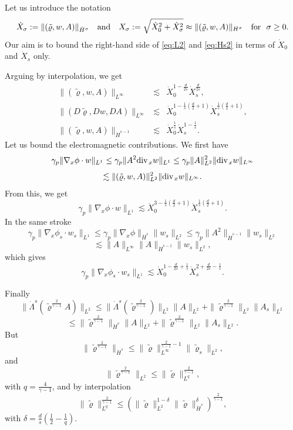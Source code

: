 \documentclass[11pt,twoside]{amsart}
\newcommand{\tildrho}{\tilde{\varrho}}
\renewcommand{\div}{\mbox{\rm div}\;\!}
\newcommand{\andf}{\quad\hbox{and}\quad}
\begin{document}

\vspace*{.2cm}

Let us introduce the  notation
$$\dot X_\sigma:=\|(\tildrho,w,A)\|_{\dot H^\sigma}\andf
X_\sigma:=\sqrt{\dot X_0^2+\dot X_\sigma^2}\approx \|(\tildrho,w,A)\|_{H^\sigma}
 \quad\hbox{for }\ \sigma\geq0.$$
Our aim is to bound the right-hand side of \eqref{eq:L2} and  \eqref{eq:Hs2} in terms of $\dot X_0$ and $\dot X_s$ only. 

Arguing by interpolation, we get 
\begin{eqnarray}\label{eq:interpo1}
\|(\tildrho,w,A)\|_{L^\infty}&\!\!\!\lesssim\!\!\!& \dot X_0^{1-\frac d{2s}}\dot X_s^{\frac d{2s}},\\\label{eq:interpo2}
\|(D\tildrho,Dw,DA)\|_{L^\infty}&\!\!\!\lesssim\!\!\!& \dot X_0^{1-\frac1s(\frac d2+1)}\dot X_s^{\frac 1s(\frac d2+1)},\\ \label{eq:interpo3}
\|(\tildrho,w,A)\|_{\dot H^{s-1}}&\!\!\!\lesssim\!\!\!& \dot X_0^{\frac1s}\dot X_s^{1-\frac1s}.
\end{eqnarray}
Let us bound the electromagnetic contributions.
We first have
$$
\gamma_p\|\nabla_x\phi\cdot w\|_{L^1}
\leq
\gamma_p\|A^2\div_x w\|_{L^1}
\leq
\gamma_p\|A\|_{L^2}^2\|\div_x w\|_{L^\infty}
$$
$$
\lesssim
\|(\tildrho,w,A)\|_{L^2}^2\|\div_x w\|_{L^\infty}.
$$
From this, we get
$$
\gamma_p\|\nabla_x\phi\cdot w\|_{L^1}
\lesssim 
\dot X_0^{3-\frac{1}{s}(\frac{d}{2}+1)}
\dot X_s^{\frac{1}{s}(\frac{d}{2}+1)}.
$$
In the same stroke 
$$
\gamma_p\|\nabla_x\phi_s\cdot w_s\|_{L^1}
\leq
\gamma_p\|\nabla_x\phi\|_{\dot H^s}\| w_s\|_{L^2}
\leq
\gamma_p\|A^2\|_{\dot H^{s-1}}\| w_s\|_{L^2}$$
$$
\lesssim
\|A\|_{L^\infty}\|A\|_{\dot H^{s-1}}\| w_s\|_{L^2},
$$
which gives
$$
\gamma_p\|\nabla_x\phi_s\cdot w_s\|_{L^1}
\lesssim
\dot X_0^{1-\frac{d}{2s}+\frac{1}{s}}
\dot X_s^{2+\frac{d}{2s}-\frac{1}{s}}.
$$


Finally
$$
\|\dot\Lambda^s(\tildrho^{\frac{2}{\gamma-1}} A)\|_{L^2}
\leq
\|\dot\Lambda^s(\tildrho^{\frac{2}{\gamma-1}} )\|_{L^2}\|A\|_{L^2}
+\|\tildrho^{\frac{2}{\gamma-1}} \|_{L^2}\|A_s\|_{L^2}
$$
$$
\leq
\|\tildrho^{\frac{2}{\gamma-1}} \|_{\dot H^s}\|A\|_{L^2}
+\|\tildrho^{\frac{2}{\gamma-1}} \|_{L^2}\|A_s\|_{L^2}.
$$
But
$$
\|\tildrho^{\frac{2}{\gamma-1}} \|_{\dot H^s}
\leq
\|\tildrho\|_{L^\infty}^{\frac{2}{\gamma-1}-1} \|\tildrho_s\|_{L^2},
$$
and
$$
\|\tildrho^{\frac{2}{\gamma-1}} \|_{L^2}
\leq
\|\tildrho\|_{L^q}^{\frac{2}{\gamma-1}},
$$
with $q=\frac{4}{\gamma-1}$, and by interpolation
$$
\|\tildrho\|_{L^q}^{\frac{2}{\gamma-1}}
\leq
\left( \|\tildrho\|_{L^2}^{1-\delta}\| \tildrho \|_{\dot H^s}^{\delta}
\right)^{\frac{2}{\gamma-1}},
$$
with $\delta=\frac{d}{s}\left(\frac{1}{2}-\frac{1}{q}\right)$.
\end{document}
